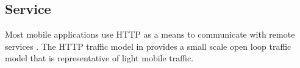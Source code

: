 \subsection{Service}
Most mobile applications use HTTP as a means to communicate with remote services \cite{maier2010first,falaki2010first}. The HTTP traffic model in \cite{liu2001traffic} provides a small scale open loop traffic model that is representative of light mobile traffic.

